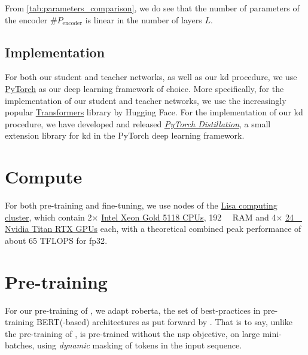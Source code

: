From \cref{tab:parameters_comparison}, we do see that the number of parameters of the encoder $\#P_{\text{encoder}}$ is linear in the number of layers $L$.


\subsection{Implementation}
\label{subsec:implementation}
For both our student and teacher networks, as well as our \gls{kd} procedure, we use \href{https://github.com/pytorch/pytorch/}{PyTorch} \citep{paszke2019pytorch} as our deep learning framework of choice. More specifically, for the implementation of our student and teacher networks, we use the increasingly popular \href{https://github.com/huggingface/transformers/}{Transformers} library \citep{wolf2019huggingfaces} by Hugging Face. For the implementation of our \gls{kd} procedure, we have developed and released \emph{\href{https://github.com/sgraaf/pytorch_distillation}{PyTorch Distillation}}, a small extension library for \gls{kd} in the PyTorch deep learning framework.


\section{Compute}
\label{sec:compute}
For both pre-training and fine-tuning, we use nodes of the \href{https://userinfo.surfsara.nl/systems/lisa/description}{Lisa computing cluster}, which contain 2$\times$ \href{https://ark.intel.com/content/www/us/en/ark/products/120473/intel-xeon-gold-5118-processor-16-5m-cache-2-30-ghz.html}{Intel Xeon Gold 5118 CPUs}, \SI{192}{\giga\byte} RAM and 4$\times$ \href{https://www.nvidia.com/en-gb/titan/titan-rtx/}{\SI{24}{\giga\byte} Nvidia Titan RTX GPUs} each, with a theoretical combined peak performance of about 65 TFLOPS for \gls{fp32}.


\section{Pre-training}
\label{sec:training}
For our pre-training of \bertstudent, we adapt \gls{roberta}, the set of best-practices in pre-training BERT(-based) architectures as put forward by \citet{liu2019roberta}. That is to say, unlike the pre-training of \bertbase \citep{devlin2018bert}, \bertstudent is pre-trained without the \gls{nsp} objective, on large mini-batches, using \emph{dynamic} masking of tokens in the input sequence.

